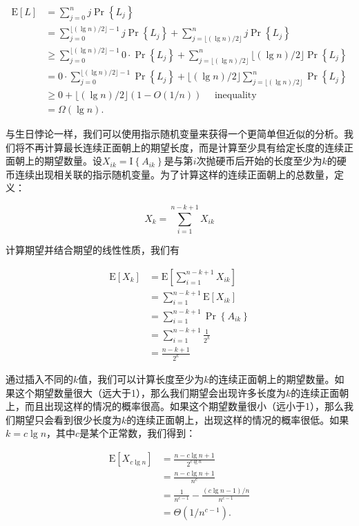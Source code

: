 \documentclass[lang=cn,newtx,10pt,scheme=chinese]{elegantbook}
\begin{document}
$$
\begin{aligned}
\mathrm{E}[L] & =\sum_{j=0}^n j \operatorname{Pr}\left\{L_j\right\} \\
& =\sum_{j=0}^{\lfloor(\lg n) / 2\rfloor-1} j \operatorname{Pr}\left\{L_j\right\}+\sum_{j=\lfloor(\lg n) / 2\rfloor}^n j \operatorname{Pr}\left\{L_j\right\} \\
& \geq \sum_{j=0}^{\lfloor(\lg n) / 2\rfloor-1} 0 \cdot \operatorname{Pr}\left\{L_j\right\}+\sum_{j=\lfloor(\lg n) / 2\rfloor}^n\lfloor(\lg n) / 2\rfloor \operatorname{Pr}\left\{L_j\right\} \\
& =0 \cdot \sum_{j=0}^{\lfloor(\lg n) / 2\rfloor-1} \operatorname{Pr}\left\{L_j\right\}+\lfloor(\lg n) / 2\rfloor \sum_{j=\lfloor(\lg n) / 2\rfloor}^n \operatorname{Pr}\left\{L_j\right\} \\
& \geq 0+\lfloor(\lg n) / 2\rfloor(1-O(1 / n)) \quad \text { inequality } \\
& =\Omega(\lg n) .
\end{aligned}
$$

与生日悖论一样，我们可以使用指示随机变量来获得一个更简单但近似的分析。我们将不再计算最长连续正面朝上的期望长度，而是计算至少具有给定长度的连续正面朝上的期望数量。设$X_{ik}=\mathrm{I}\left\{A_{ik}\right\}$是与第$i$次抛硬币后开始的长度至少为$k$的硬币连续出现相关联的指示随机变量。为了计算这样的连续正面朝上的总数量，定义：

$$
X_k=\sum_{i=1}^{n-k+1} X_{i k}
$$

计算期望并结合期望的线性性质，我们有

$$
\begin{aligned}
\mathrm{E}\left[X_k\right] & =\mathrm{E}\left[\sum_{i=1}^{n-k+1} X_{i k}\right] \\
& =\sum_{i=1}^{n-k+1} \mathrm{E}\left[X_{i k}\right] \\
& =\sum_{i=1}^{n-k+1} \operatorname{Pr}\left\{A_{i k}\right\} \\
& =\sum_{i=1}^{n-k+1} \frac{1}{2^k} \\
& =\frac{n-k+1}{2^k}
\end{aligned}
$$

通过插入不同的$k$值，我们可以计算长度至少为$k$的连续正面朝上的期望数量。如果这个期望数量很大（远大于1），那么我们期望会出现许多长度为$k$的连续正面朝上，而且出现这样的情况的概率很高。如果这个期望数量很小（远小于1），那么我们期望只会看到很少长度为$k$的连续正面朝上，出现这样的情况的概率很低。如果$k=c\lg n$，其中$c$是某个正常数，我们得到：

$$
\begin{aligned}
\mathrm{E}\left[X_{c \lg n}\right] & =\frac{n-c \lg n+1}{2^{c \lg n}} \\
& =\frac{n-c \lg n+1}{n^c} \\
& =\frac{1}{n^{c-1}}-\frac{(c \lg n-1) / n}{n^{c-1}} \\
& =\Theta\left(1 / n^{c-1}\right) .
\end{aligned}
$$
\end{document}
